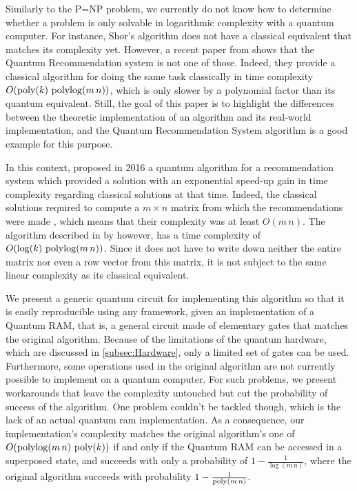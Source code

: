 \documentclass[11pt, a4paper]{article}
\begin{document}
        Similarly to the P=NP problem, we currently do not know how to determine whether a problem is only solvable in logarithmic complexity with a quantum computer. For instance, Shor's algorithm \cite{Shor} does not have a classical equivalent that matches its complexity yet. However, a recent paper from \citeauthor{Dequantized} shows that the Quantum Recommendation system is not one of those. Indeed, they provide a classical algorithm for doing the same task classically in time complexity \(O(\operatorname{poly}(k)\,\operatorname{polylog}(m\,n))\), which is only slower by a polynomial factor than its quantum equivalent. Still, the goal of this paper is to highlight the differences between the theoretic implementation of an algorithm and its real-world implementation, and the Quantum Recommendation System algorithm is a good example for this purpose.
        
        In this context, \citeauthor{QRS} proposed in 2016 a quantum algorithm for a recommendation system which provided a solution with an exponential speed-up gain in time complexity regarding classical solutions at that time. Indeed, the classical solutions required to compute a \(m\times n\) matrix from which the recommendations were made \cite{Amazon}, which means that their complexity was at least \(O(m\,n)\). The algorithm described in \cite{QRS} by \citeauthor{QRS} however, has a time complexity of \(O(\log(k)\,\operatorname{polylog}(m\,n))\). Since it does not have to write down neither the entire matrix nor even a row vector from this matrix, it is not subject to the same linear complexity as its classical equivalent.
        
        We present a generic quantum circuit for implementing this algorithm so that it is easily reproducible using any framework, given an implementation of a Quantum RAM, that is, a general circuit made of elementary gates that matches the original algorithm. Because of the limitations of the quantum hardware, which are discussed in \autoref{subsec:Hardware}, only a limited set of gates can be used. Furthermore, some operations used in the original algorithm are not currently possible to implement on a quantum computer. For such problems, we present workarounds that leave the complexity untouched but cut the probability of success of the algorithm. One problem couldn't be tackled though, which is the lack of an actual quantum ram implementation. As a consequence, our implementation's complexity matches the original algorithm's one of \(O(\operatorname{polylog}(m\,n)\,\operatorname{poly}(k))\) if and only if the Quantum RAM can be accessed in a superposed state, and succeeds with only a probability of \(1-\frac{1}{\log(m\,n)}\), where the original algorithm succeeds with probability \(1 - \frac{1}{\operatorname{poly}(m\,n)}\).
        
\end{document}
